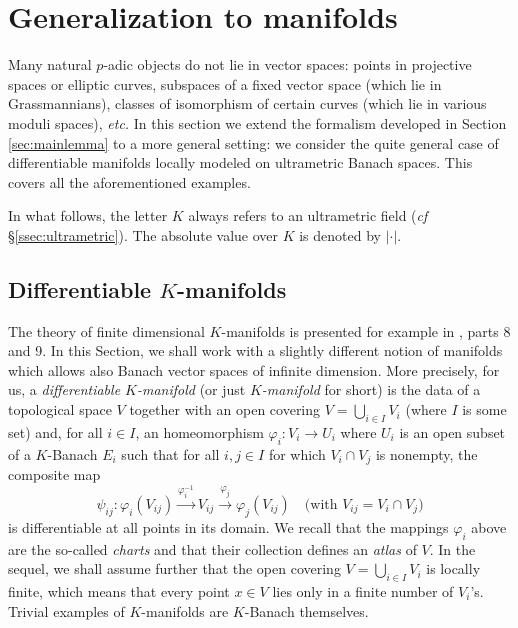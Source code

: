 \documentclass{lms}
\begin{document}
\appendix

\section{Generalization to manifolds}
\label{sec:manifold}

Many natural $p$-adic objects do not lie in vector spaces:
points in projective spaces or elliptic curves,
subspaces of a fixed vector space (which lie in Grassmannians),
classes of isomorphism of certain curves (which lie in various moduli spaces),
\emph{etc.}  In this section we extend the formalism 
developed in Section \ref{sec:mainlemma} to a more general setting:
we consider the quite general case of 
differentiable manifolds locally modeled on ultrametric Banach spaces.
This covers all the 
aforementioned examples.

In what follows, the letter $K$ always refers to an ultrametric field 
(\emph{cf} \S \ref{ssec:ultrametric}). The absolute value over $K$ is 
denoted by $|\cdot|$.

\subsection{Differentiable $K$-manifolds}
\label{ssec:manifold}

The theory of finite dimensional $K$-manifolds is presented for example 
in \cite{Schneider}, parts 8 and 9. In this Section, we shall work with
a slightly different notion of manifolds which allows also Banach vector 
spaces of infinite dimension.
More precisely, for us, a \emph{ differentiable $K$-manifold} 
(or just \emph{$K$-manifold} for short) is the data of a topological 
space $V$ together with an open covering $V = \bigcup_{i \in I} V_i$ 
(where $I$ is some set) and, for all $i \in I$, an homeomorphism 
$\varphi_i : V_i \to U_i$ where $U_i$ is an open subset of a $K$-Banach 
$E_i$ such that for all $i,j \in I$ for which $V_i \cap V_j$ is 
nonempty, the composite map
\begin{equation}
\label{eq:psiij}
\psi_{ij} : 
\varphi_i(V_{ij}) \stackrel{\varphi_i^{-1}}{\longrightarrow} 
V_{ij} \stackrel{\varphi_j}{\longrightarrow} \varphi_j(V_{ij})
\quad \text{(with } V_{ij} = V_i \cap V_j \text{)}
\end{equation}
is  differentiable at all points in its domain. We recall that
the mappings $\varphi_i$ above are the so-called \emph{charts} and that
their collection defines an \emph{atlas} of $V$. In the sequel, we shall
assume further that the open covering $V = \bigcup_{i \in I} V_i$ is
locally finite, which means that every point $x \in V$ lies only in a
finite number of $V_i$'s. Trivial examples of $K$-manifolds are 
$K$-Banach themselves.
\end{document}
